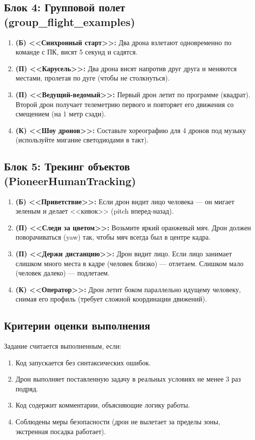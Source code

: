 \subsection{Блок 4: Групповой полет (group\_flight\_examples)}

\begin{enumerate}
    \item \textbf{(Б) <<Синхронный старт>>:} Два дрона взлетают одновременно по команде с ПК, висят 5 секунд и садятся.
    \item \textbf{(П) <<Карусель>>:} Два дрона висят напротив друг друга и меняются местами, пролетая по дуге (чтобы не столкнуться).
    \item \textbf{(П) <<Ведущий-ведомый>>:} Первый дрон летит по программе (квадрат). Второй дрон получает телеметрию первого и повторяет его движения со смещением (на 1 метр сзади).
    \item \textbf{(К) <<Шоу дронов>>:} Составьте хореографию для 4 дронов под музыку (используйте мигание светодиодами в такт).
\end{enumerate}

\subsection{Блок 5: Трекинг объектов (PioneerHumanTracking)}

\begin{enumerate}
    \item \textbf{(Б) <<Приветствие>>:} Если дрон видит лицо человека — он мигает зеленым и делает <<кивок>> (pitch вперед-назад).
    \item \textbf{(П) <<Следи за цветом>>:} Возьмите яркий оранжевый мяч. Дрон должен поворачиваться (yaw) так, чтобы мяч всегда был в центре кадра.
    \item \textbf{(П) <<Держи дистанцию>>:} Дрон видит лицо. Если лицо занимает слишком много места в кадре (человек близко) — отлетаем. Слишком мало (человек далеко) — подлетаем.
    \item \textbf{(К) <<Оператор>>:} Дрон летит боком параллельно идущему человеку, снимая его профиль (требует сложной координации движений).
\end{enumerate}

\subsection{Критерии оценки выполнения}
Задание считается выполненным, если:
\begin{enumerate}
    \item Код запускается без синтаксических ошибок.
    \item Дрон выполняет поставленную задачу в реальных условиях не менее 3 раз подряд.
    \item Код содержит комментарии, объясняющие логику работы.
    \item Соблюдены меры безопасности (дрон не вылетает за пределы зоны, экстренная посадка работает).
\end{enumerate}

